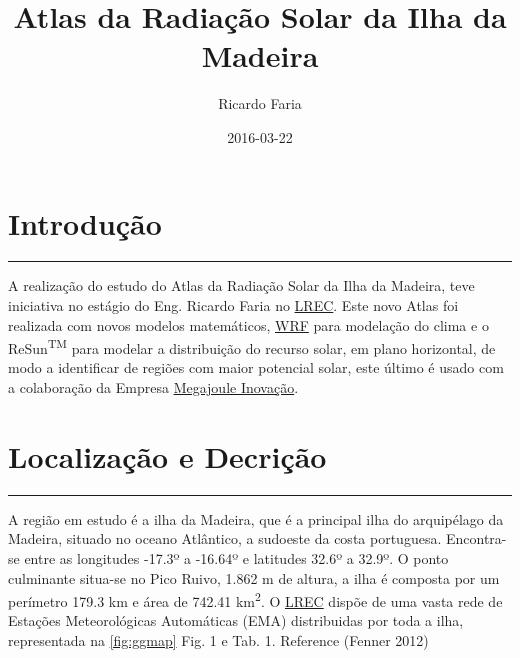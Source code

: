 \documentclass[]{article}
\title{Atlas da Radiação Solar da Ilha da Madeira}
\author{Ricardo Faria}
\date{2016-03-22}
\begin{document}
\maketitle

\section{Introdução}\label{introducao}

\begin{center}\rule{0.5\linewidth}{\linethickness}\end{center}

A realização do estudo do Atlas da Radiação Solar da Ilha da Madeira,
teve iniciativa no estágio do Eng. Ricardo Faria no
\href{http://www.lrec.pt}{LREC}. Este novo Atlas foi realizada com novos
modelos matemáticos, \href{http://www.wrf-model.org}{WRF} para modelação
do clima e o ReSun\textsuperscript{TM} para modelar a distribuição do
recurso solar, em plano horizontal, de modo a identificar de regiões com
maior potencial solar, este último é usado com a colaboração da Empresa
\href{http://megajoule.pt}{Megajoule Inovação}.

\section{Localização e Decrição}\label{localizacao-e-decricao}

\begin{center}\rule{0.5\linewidth}{\linethickness}\end{center}

A região em estudo é a ilha da Madeira, que é a principal ilha do
arquipélago da Madeira, situado no oceano Atlântico, a sudoeste da costa
portuguesa. Encontra-se entre as longitudes -17.3º a -16.64º e latitudes
32.6º a 32.9º. O ponto culminante situa-se no Pico Ruivo, 1.862 m de
altura, a ilha é composta por um perímetro 179.3 km e área de 742.41
km\textsuperscript{2}. O \href{http://www.lrec.pt}{LREC} dispõe de uma
vasta rede de Estações Meteorológicas Automáticas (EMA) distribuidas por
toda a ilha, representada na \ref{fig:ggmap} Fig. 1 e Tab. 1. Reference
(Fenner 2012)
\end{document}
